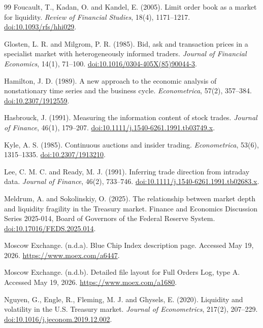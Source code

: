 \documentclass[12pt,a4paper]{article}
\newcommand{\doi}[1]{\href{https://doi.org/#1}{doi:#1}}
\begin{document}
\begin{thebibliography}{99}
Foucault, T., Kadan, O.  and Kandel, E. (2005).
\newblock Limit order book as a market for liquidity.
\newblock \emph{Review of Financial Studies}, 18(4), 1171--1217.
\newblock \doi{10.1093/rfs/hhi029}.

Glosten, L. R.  and Milgrom, P. R. (1985).
\newblock Bid, ask and transaction prices in a specialist market with heterogeneously informed traders.
\newblock \emph{Journal of Financial Economics}, 14(1), 71--100.
\newblock \doi{10.1016/0304-405X(85)90044-3}.

Hamilton, J. D. (1989).
\newblock A new approach to the economic analysis of nonstationary time series and the business cycle.
\newblock \emph{Econometrica}, 57(2), 357--384.
\newblock \doi{10.2307/1912559}.

Hasbrouck, J. (1991).
\newblock Measuring the information content of stock trades.
\newblock \emph{Journal of Finance}, 46(1), 179--207.
\newblock \doi{10.1111/j.1540-6261.1991.tb03749.x}.

Kyle, A. S. (1985).
\newblock Continuous auctions and insider trading.
\newblock \emph{Econometrica}, 53(6), 1315--1335.
\newblock \doi{10.2307/1913210}.

Lee, C. M. C.  and Ready, M. J. (1991).
\newblock Inferring trade direction from intraday data.
\newblock \emph{Journal of Finance}, 46(2), 733--746.
\newblock \doi{10.1111/j.1540-6261.1991.tb02683.x}.

Meldrum, A.  and Sokolinskiy, O. (2025).
\newblock The relationship between market depth and liquidity fragility in the Treasury market.
\newblock Finance and Economics Discussion Series 2025-014, Board of Governors of the Federal Reserve System.
\newblock \doi{10.17016/FEDS.2025.014}.

Moscow Exchange. (n.d.a).
\newblock Blue Chip Index description page.
\newblock Accessed May 19, 2026.
\newblock \url{https://www.moex.com/a6447}.

Moscow Exchange. (n.d.b).
\newblock Detailed file layout for Full Orders Log, type A.
\newblock Accessed May 19, 2026.
\newblock \url{https://www.moex.com/a1680}.

Nguyen, G., Engle, R., Fleming, M. J.  and Ghysels, E. (2020).
\newblock Liquidity and volatility in the U.S. Treasury market.
\newblock \emph{Journal of Econometrics}, 217(2), 207--229.
\newblock \doi{10.1016/j.jeconom.2019.12.002}.


\end{thebibliography}
\end{document}
